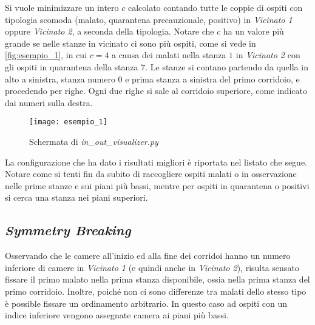 \noindent
Si vuole minimizzare un intero $c$ calcolato contando tutte le coppie di ospiti con tipologia scomoda (malato, quarantena precauzionale, positivo) in \emph{Vicinato 1} oppure \emph{Vicinato 2}, a seconda della tipologia.
Notare che $c$ ha un valore più grande se nelle stanze in vicinato ci sono più ospiti, come si vede in \autoref{fig:esempio_1}, in cui $c=4$ a causa dei malati nella stanza $1$ in \emph{Vicinato 2} con gli ospiti in quarantena della stanza $7$.
Le stanze si contano partendo da quella in alto a sinistra, stanza numero 0 e prima stanza a sinistra del primo corridoio, e procedendo per righe.
Ogni due righe si sale al corridoio superiore, come indicato dai numeri sulla destra.

\begin{figure}[ht]
  \centering
  \texttt{[image: esempio\_1]}
  \caption{Schermata di \emph{in\_out\_visualizer.py}}
  \label{fig:esempio_1}
\end{figure}

\noindent
La configurazione che ha dato i risultati migliori è riportata nel listato che segue.
Notare come si tenti fin da subito di raccogliere ospiti malati o in osservazione nelle prime stanze e sui piani più bassi, mentre per ospiti in quarantena o positivi si cerca una stanza nei piani superiori.


\subsection{\emph{Symmetry Breaking}}
Osservando che le camere all'inizio ed alla fine dei corridoi hanno un numero inferiore di camere in \emph{Vicinato 1} (e quindi anche in \emph{Vicinato 2}), risulta sensato fissare il primo malato nella prima stanza disponibile, ossia nella prima stanza del primo corridoio.
Inoltre, poiché non ci sono differenze tra malati dello stesso tipo è possible fissare un ordinamento arbitrario.
In questo caso ad ospiti con un indice inferiore vengono assegnate camera ai piani più bassi.

